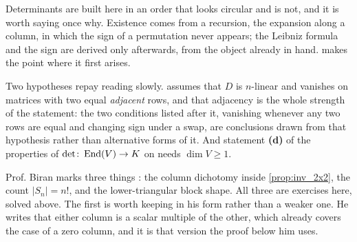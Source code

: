 \begin{ainote}
Determinants are built here in an order that looks circular and is not, and it
is worth saying once why. Existence comes from a recursion, the expansion along
a column, in which the sign of a permutation never appears; the Leibniz formula
and the sign are derived only afterwards, from the object already in hand.
 makes the point where it first arises.

Two hypotheses repay reading slowly.  assumes that
$D$ is $n$-linear and vanishes on matrices with two equal \emph{adjacent} rows,
and that adjacency is the whole strength of the statement: the two conditions
listed after it, vanishing whenever any two rows are equal and changing sign
under a swap, are conclusions drawn from that hypothesis rather than
alternative forms of it. And statement \textbf{(d)} of the properties of
$\det \colon \operatorname{End}(V) \to K$ on 
needs $\dim V \ge 1$.

Prof. Biran marks three things : the column dichotomy inside
\cref{prop:inv_2x2}, the count $|S_n| = n!$, and the lower-triangular block
shape. All three are exercises here, solved above. The first is worth keeping in
his form rather than a weaker one. He writes that either column is a scalar
multiple of the other, which already covers the case of a zero column, and it is
that version the proof below him uses.
\end{ainote}

